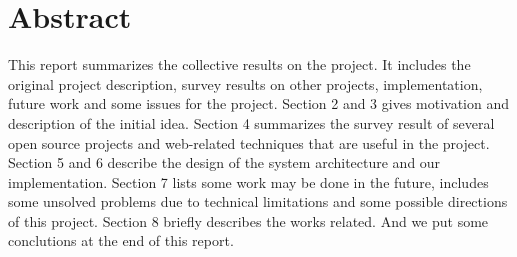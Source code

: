 \section{Abstract}

This report summarizes the collective results on the project. It includes the original project description, survey results on other projects, implementation, future work and some issues for the project.
Section 2 and 3 gives motivation and description of the initial idea. Section 4 summarizes the survey result of several open source projects and web-related techniques that are useful in the project. Section 5 and 6 describe the design of the system architecture and our implementation. Section 7 lists some work may be done in the future, includes some unsolved problems due to technical limitations and some possible directions of this project. Section 8 briefly describes the works related. And we put some conclutions at the end of this report.
